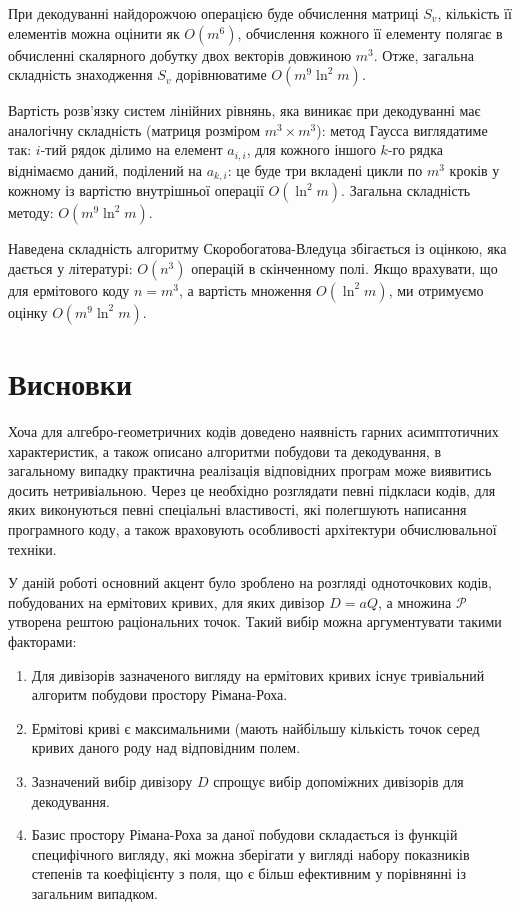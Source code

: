 \documentclass[a4paper,12pt,oneside]{article}
\begin{document}
При декодуванні найдорожчою операцією буде обчислення матриці $S_v$, кількість її елементів можна оцінити як $O(m^6)$, обчислення кожного її елементу полягає 
в обчисленні скалярного добутку двох векторів довжиною $m^3$. Отже, загальна складність знаходження $S_v$ дорівнюватиме $O(m^9 \ln^2 m)$.

Вартість розв'язку систем лінійних рівнянь, яка виникає при декодуванні має аналогічну складність (матриця розміром $m^3 \times m^3$): 
метод Гаусса виглядатиме так: $i$-тий рядок ділимо на елемент $a_{i,i}$, для кожного іншого $k$-го рядка віднімаємо даний, поділений на $a_{k,i}$:
це буде три вкладені цикли по $m^3$ кроків у кожному із вартістю внутрішньої операції $O(\ln^2 m)$. Загальна складність методу: $O(m^9 \ln^2 m)$.

Наведена складність алгоритму Скоробогатова-Вледуца збігається із оцінкою, яка дається у літературі: $O(n^3)$ операцій в скінченному полі. 
Якщо врахувати, що для ермітового коду $n=m^3$, а вартість множення $O(\ln^2 m)$, ми отримуємо оцінку $O(m^9 \ln^2 m)$.

\pagebreak
\section*{Висновки}
Хоча для алгебро-геометричних кодів доведено наявність гарних асимптотичних характеристик, а також описано алгоритми побудови та декодування,
в загальному випадку практична реалізація відповідних програм може виявитись досить нетривіальною. Через це необхідно розглядати певні підкласи 
кодів, для яких виконуються певні спеціальні властивості, які полегшують написання програмного коду, а також враховують особливості архітектури 
обчислювальної техніки.

У даній роботі основний акцент було зроблено на розгляді одноточкових кодів, побудованих на ермітових кривих, для яких дивізор $D=aQ$, а 
множина $\mathcal{P}$ утворена рештою раціональних точок. Такий вибір можна аргументувати такими факторами:
\begin{enumerate}
    \item Для дивізорів зазначеного вигляду на ермітових кривих існує тривіальний алгоритм побудови простору Рімана-Роха.
    \item Ермітові криві є максимальними (мають найбільшу кількість точок серед кривих даного роду над відповідним полем.
    \item Зазначений вибір дивізору $D$ спрощує вибір допоміжних дивізорів для декодування.
    \item Базис простору Рімана-Роха за даної побудови складається із функцій специфічного вигляду, які можна зберігати у вигляді набору показників степенів та 
        коефіцієнту з поля, що є більш ефективним у порівнянні із загальним випадком.
\end{enumerate}
\end{document}
